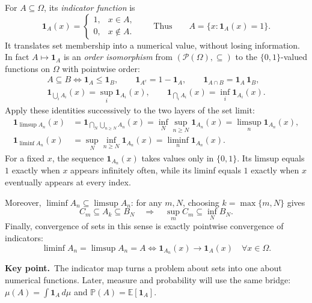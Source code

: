 \documentclass[10pt,a4paper]{article}
\newcommand{\PO}{\mathcal P(\Omega)}
\newcommand{\ind}[1]{\mathbf 1_{#1}}
\newcommand{\key}[1]{\par\smallskip\textcolor{accent}{\textbf{Key point.}}\ #1\par}
\begin{document}
For $A\subseteq\Omega$, its \emph{indicator function} is
\[
\ind A(x)=\begin{cases}1,&x\in A,\\0,&x\notin A.\end{cases}
\qquad\text{Thus}\qquad
A=\{x:\ind A(x)=1\}.
\]
It translates set membership into a numerical value, without losing information. In fact $A\mapsto\ind A$ is an \emph{order isomorphism} from $(\PO,\subseteq)$ to the $\{0,1\}$-valued functions on $\Omega$ with pointwise order:
\[
\begin{gathered}
A\subseteq B\iff\ind A\le\ind B,\qquad
\ind{A^c}=1-\ind A,\qquad
\ind{A\cap B}=\ind A\,\ind B,\\
\ind{\bigcup_i A_i}(x)=\sup_i\ind{A_i}(x),\qquad
\ind{\bigcap_i A_i}(x)=\inf_i\ind{A_i}(x).
\end{gathered}
\]
Apply these identities successively to the two layers of the set limit:
\[
\begin{aligned}
\ind{\limsup A_n}(x)
&=\ind{\bigcap_N\bigcup_{n\ge N}A_n}(x)
=\inf_N\sup_{n\ge N}\ind{A_n}(x)
=\limsup_n\ind{A_n}(x),\\
\ind{\liminf A_n}(x)
&=\sup_N\inf_{n\ge N}\ind{A_n}(x)
=\liminf_n\ind{A_n}(x).
\end{aligned}
\]
For a fixed $x$, the sequence $\ind{A_n}(x)$ takes values only in $\{0,1\}$. Its limsup equals $1$ exactly when $x$ appears infinitely often, while its liminf equals $1$ exactly when $x$ eventually appears at every index.

Moreover, $\liminf A_n\subseteq\limsup A_n$: for any $m,N$, choosing $k=\max\{m,N\}$ gives
\[
C_m\subseteq A_k\subseteq B_N
\quad\Longrightarrow\quad
\sup_m C_m\subseteq\inf_N B_N.
\]
Finally, convergence of sets in this sense is exactly pointwise convergence of indicators:
\[
\boxed{\liminf A_n=\limsup A_n=A
\iff\ind{A_n}(x)\to\ind A(x)\quad\forall x\in\Omega.}
\]
\key{The indicator map turns a problem about sets into one about numerical functions. Later, measure and probability will use the same bridge: $\mu(A)=\int\ind A\,d\mu$ and $\mathbb P(A)=\mathbb E[\ind A]$.}
\end{document}
